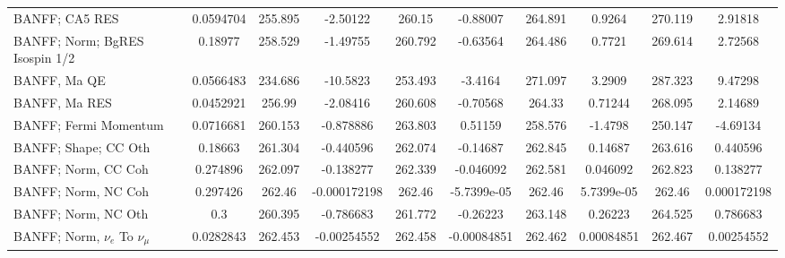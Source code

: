 \begin{tabular}{| l | S | S  S | S  S | S  S | S  S | }
                                                                  BANFF; CA5 RES &       0.0594704 &         255.895 &        -2.50122 &          260.15 &        -0.88007 &         264.891 &          0.9264 &         270.119 &         2.91818 \\ 
                                                  BANFF; Norm; BgRES Isospin 1/2 &         0.18977 &         258.529 &        -1.49755 &         260.792 &        -0.63564 &         264.486 &          0.7721 &         269.614 &         2.72568 \\ 
                                                                    BANFF, Ma QE &       0.0566483 &         234.686 &        -10.5823 &         253.493 &         -3.4164 &         271.097 &          3.2909 &         287.323 &         9.47298 \\ 
                                                                   BANFF, Ma RES &       0.0452921 &          256.99 &        -2.08416 &         260.608 &        -0.70568 &          264.33 &         0.71244 &         268.095 &         2.14689 \\ 
                                                           BANFF; Fermi Momentum &       0.0716681 &         260.153 &       -0.878886 &         263.803 &         0.51159 &         258.576 &         -1.4798 &         250.147 &        -4.69134 \\ 
                                                            BANFF; Shape; CC Oth &         0.18663 &         261.304 &       -0.440596 &         262.074 &        -0.14687 &         262.845 &         0.14687 &         263.616 &        0.440596 \\ 
                                                             BANFF; Norm, CC Coh &        0.274896 &         262.097 &       -0.138277 &         262.339 &       -0.046092 &         262.581 &        0.046092 &         262.823 &        0.138277 \\ 
                                                             BANFF; Norm, NC Coh &        0.297426 &          262.46 &    -0.000172198 &          262.46 &     -5.7399e-05 &          262.46 &      5.7399e-05 &          262.46 &     0.000172198 \\ 
                                                             BANFF; Norm, NC Oth &             0.3 &         260.395 &       -0.786683 &         261.772 &        -0.26223 &         263.148 &         0.26223 &         264.525 &        0.786683 \\ 
                                           BANFF; Norm, $\nu_{e}$ To $\nu_{\mu}$ &       0.0282843 &         262.453 &     -0.00254552 &         262.458 &     -0.00084851 &         262.462 &      0.00084851 &         262.467 &      0.00254552 \\ 

\end{tabular}

